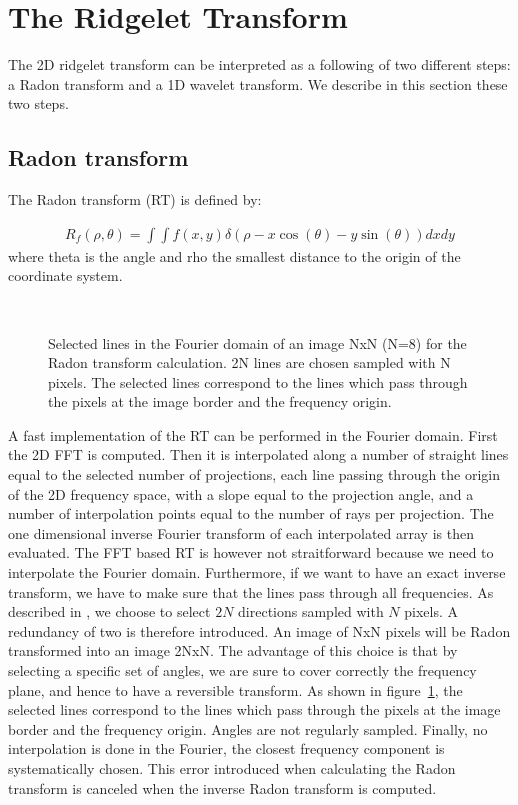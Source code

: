 \documentclass{article}
\begin{document}
\section{The Ridgelet Transform}

The 2D ridgelet transform can be interpreted as a following of two
different steps: a Radon transform and a 1D wavelet 
transform. We describe in this section these two steps.

\subsection{Radon transform}
The Radon transform (RT) is defined by:

\begin{eqnarray}
R_f(\rho, \theta) = \int \int f(x,y) 
     \delta (\rho - x \cos ( \theta ) - y \sin ( \theta) ) dx dy
\end{eqnarray}
where theta is the angle and rho
the smallest distance to the origin of the coordinate system. 


\begin{figure}[htb]
\centerline{
\hbox{
}}
\caption{Selected lines in the Fourier domain of an image NxN (N=8) 
for the Radon transform calculation. 2N lines are chosen sampled with N pixels.
The selected lines correspond to the
lines which pass through the pixels at the image border and the 
frequency origin.}
\label{fig_radon}
\end{figure}

A fast implementation of the RT can be performed in the Fourier domain.
First the 2D FFT is computed. Then it is interpolated along a number 
of straight lines equal to the selected number of projections, each line
passing through the origin of the 2D frequency space, with a slope 
equal to the projection angle, and a number of interpolation points
equal to the number of rays per projection. The one dimensional inverse
Fourier transform of each interpolated array is then evaluated.
The FFT based RT  is however not straitforward because we need to 
interpolate the Fourier domain. Furthermore, if we want to have 
an exact inverse transform, we have to make sure that the lines
pass through all frequencies. 
As described in \cite{cur:candes98}, we choose to select $2N$ directions
sampled with $N$ pixels.  
A redundancy of two is therefore introduced.
An image of NxN pixels will be Radon transformed into an image 2NxN.
The advantage of this choice is that by selecting a specific set of 
angles, we are sure to cover correctly the frequency plane, and hence
to have a reversible transform. As shown in figure~\ref{fig_radon}, 
the selected lines correspond to the
lines which pass through the pixels at the image border and the 
frequency origin. Angles are not regularly sampled. Finally, no 
interpolation is done in the Fourier, the closest frequency component
is systematically chosen. This error introduced when calculating 
the Radon transform is canceled when the inverse Radon transform 
is computed.
\end{document}
